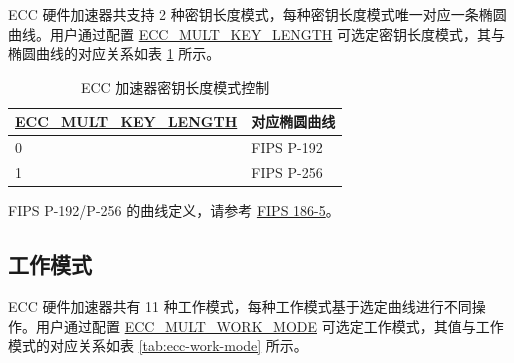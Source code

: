 \documentclass[main\_\_CN.tex]{subfiles}
\begin{document}
\chipname{} ECC 硬件加速器共支持 2 种密钥长度模式，每种密钥长度模式唯一对应一条椭圆曲线。用户通过配置 \hyperref[fielddesc:ECCMULTKEYLENGTH]{ECC\_MULT\_KEY\_LENGTH} 可选定密钥长度模式，其与椭圆曲线的对应关系如表 \ref{tab:ecc-key-length} 所示。


\begin{table}[H]
    \centering
    \caption{ECC 加速器密钥长度模式控制}
    \label{tab:ecc-key-length}
    \begin{threeparttable}
    \begin{tabular}{|p{4.2cm}|p{3.6cm}|}
    \hline
        \rowcolor{lightgray}
        \textbf{\hyperref[fielddesc:ECCMULTKEYLENGTH]{ECC\_MULT\_KEY\_LENGTH}} & \textbf{对应椭圆曲线\tnote{*}} \\ \hline
        0 & FIPS P-192  \\\hline
        1 & FIPS P-256  \\\hline
    \end{tabular}
    \begin{tablenotes}
        \item[*] FIPS P-192/P-256 的曲线定义，请参考 \href{https://nvlpubs.nist.gov/nistpubs/FIPS/NIST.FIPS.186-5.pdf}{FIPS 186-5}。
    \end{tablenotes}
    \end{threeparttable}
\end{table}

\subsection{工作模式}

\chipname{} ECC 硬件加速器共有 11 种工作模式，每种工作模式基于选定曲线进行不同操作。用户通过配置 \hyperref[fielddesc:ECCMULTWORKMODE]{ECC\_MULT\_WORK\_MODE} 可选定工作模式，其值与工作模式的对应关系如表 \ref{tab:ecc-work-mode} 所示。
\end{document}
